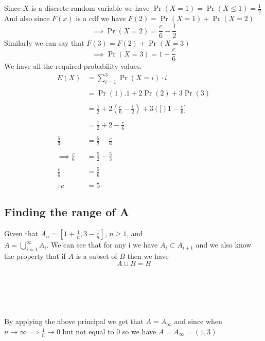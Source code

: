 \documentclass[journal,12pt,twocolumn]{IEEEtran}
\providecommand{\brak}[1]{\ensuremath{\left(#1\right)}}
\begin{document}
Since $X$ is a discrete random variable we have $\Pr\brak{X=1} = \Pr\brak{X\leq1} = \frac{1}{2}$\\And also since $F\brak{x}$ is a cdf we have $F\brak{2} = \Pr\brak{X=1}+\Pr\brak{X=2}$\\
$$\implies \Pr\brak{X=2} = \frac{c}{6}-\frac{1}{2}$$
Similarly we can say that $F\brak{3} = F\brak{2} + \Pr\brak{X=3}$
$$\implies \Pr\brak{X=3} = 1 - \frac{c}{6}$$
We have all the required probability values.
\begin{align}
 E\brak{X} &= \sum_{i=1}^{3}\Pr\brak{X=i}\cdot i\\
\nonumber \\
 &= \Pr\brak{1}.1 +2\Pr\brak{2} + 3\Pr\brak{3}\\
\nonumber \\
 &= \frac{1}{2}+ 2\brak{\frac{c}{6}-\frac{1}{2}}+3\brak[1-\frac{c}{6}]\\
\nonumber \\
 &= \frac{1}{2} + 2 - \frac{c}{6}\\
\nonumber \\
 \frac{5}{3} &= \frac{5}{2} - \frac{c}{6}\\
\nonumber \\
 \implies \frac{c}{6} &= \frac{5}{2} - \frac{5}{3}\\
\nonumber \\
 \frac{c}{6} &= \frac{5}{6}\\
\nonumber \\
 \therefore c &= 5
\end{align}


\subsection{Finding the range of A}
Given that $A_n = \left[1+\frac{1}{n},3-\frac{1}{n}\right]$, $n\geq1$, and \\$A = \bigcup_{i=1}^{\infty}A_i$. We can see  that for any i we have $A_i \subset A_{i+1}$ and we also know the property that if $A$ is a subset of $B$ then we have $$A\cup B = B$$\\\\\\\\\\
By applying the above principal we get that $A = A_\infty$ and since when $n \rightarrow \infty \implies \frac{1}{n} \rightarrow 0$ but not equal to 0 so we have $A = A_\infty = \brak{1,3}$
\end{document}
